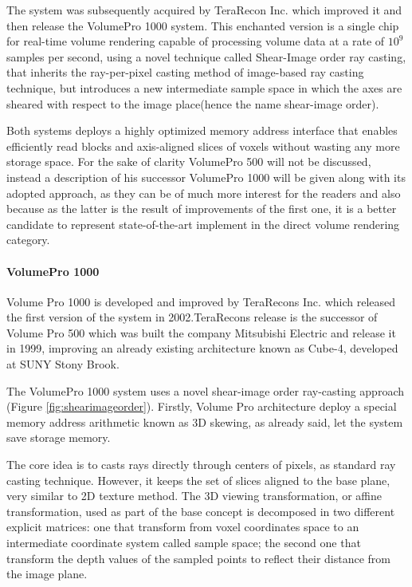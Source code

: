 \documentclass[12pt,a4paper]{extarticle}
\newcommand{\linespace}{\vspace{8pt}}
\begin{document}
The system was subsequently acquired by TeraRecon Inc. which improved it and then release the VolumePro 1000 system. This enchanted version is a single chip for real-time volume rendering capable of processing volume data at a rate of $10^9$ samples per second, using a novel technique called Shear-Image order ray casting, that inherits the ray-per-pixel casting method of image-based ray casting technique, but introduces a new intermediate sample space in which the axes are sheared with respect to the image place(hence the name shear-image order). 
\linespace

Both systems deploys a highly optimized memory address interface that enables efficiently read blocks and axis-aligned slices of voxels without wasting any more storage space.%
For the sake of clarity VolumePro 500 will not be discussed, instead a description of his successor VolumePro 1000 will be given along with its adopted approach, as they can be of much more interest for the readers and also because as the latter is the result of improvements of the first one, it is a better candidate to represent state-of-the-art implement in the direct volume rendering category. 


\paragraph{VolumePro 1000} Volume Pro 1000 is developed and improved by TeraRecons Inc. which released the first version of the system in 2002.TeraRecons release is the successor of Volume Pro 500 which was built  the company Mitsubishi Electric and release it in 1999, improving an already existing architecture known as Cube-4, developed at SUNY Stony Brook.
\linespace

The VolumePro 1000 system %
uses a novel shear-image order ray-casting approach (Figure \ref{fig:shearimageorder}). %
 Firstly, Volume Pro architecture deploy a special memory address arithmetic known as 3D skewing, as already said, let the system save storage memory. 
\linespace

The core idea is to casts rays directly through centers of pixels, as standard ray casting technique. However, it keeps the set of slices aligned to the base plane, very similar to 2D texture method. The 3D viewing transformation, or affine transformation, used as part of the base concept is decomposed in two different explicit matrices: one that transform from voxel coordinates space to an intermediate coordinate system called sample space; the second one that transform the depth values of the sampled points to reflect their distance from the image plane. %
\end{document}
